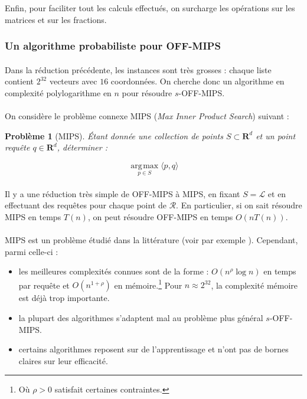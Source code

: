 \documentclass{scrartcl}
\DeclareMathOperator*{\argmax}{\arg\!\max}
\newtheorem*{Prob}{Problème}
\begin{document}
Enfin, pour faciliter tout les calculs effectués, on surcharge les opérations sur les matrices et sur les fractions.

\subsubsection{Un algorithme probabiliste pour OFF-MIPS}

\paragraph*{}
Dans la réduction précédente, les instances sont très grosses : chaque liste contient $2^{32}$ vecteurs avec $16$ coordonnées. On cherche
donc un algorithme en complexité polylogarithme en $n$ pour résoudre $s$-OFF-MIPS.

\paragraph*{}
On considère le problème connexe MIPS (\textit{Max Inner Product Search}) suivant :

\begin{Prob}[MIPS]
Étant donnée une collection de points $S \subset \mathbf{R}^d$ et un point requête $q \in \mathbf{R}^d$, déterminer :

$$\underset{p\in S}{\argmax}\langle p, q\rangle$$
\end{Prob}

\paragraph*{}
Il y a une réduction très simple de OFF-MIPS à MIPS, en fixant $S = \mathcal{L}$ et en effectuant des requêtes
pour chaque point de $\mathcal{R}$. En particulier, si on sait résoudre MIPS en temps $T(n)$, on peut résoudre OFF-MIPS en temps $O(nT(n))$.

\paragraph*{}
MIPS est un problème étudié dans la littérature (voir par exemple \cite{Shri14}). Cependant, parmi celle-ci :

\begin{itemize}
	\item les meilleures complexités connues sont de la forme : $O(n^\rho \log n)$ en temps par requête et $O(n^{1+\rho})$ en mémoire.\footnote{Où $\rho>0$
	satisfait certaines contraintes.} Pour $n \approx 2^{32}$, la complexité mémoire est déjà trop importante.
	\item la plupart des algorithmes s'adaptent mal au problème plus général $s$-OFF-MIPS.
	\item certains algorithmes reposent sur de l'apprentissage et n'ont pas de bornes claires sur leur efficacité.
\end{itemize}
\end{document}
